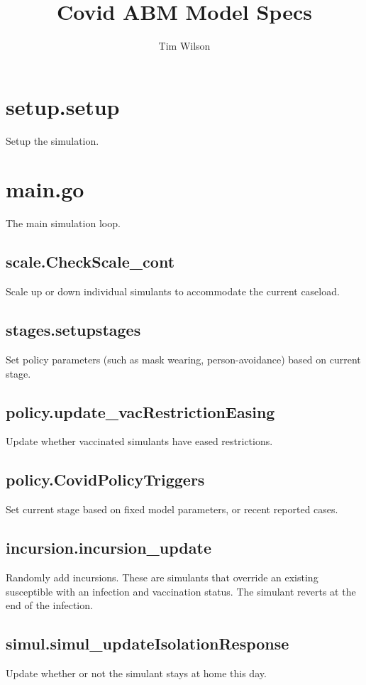 \documentclass[]{article}
\title{Covid ABM Model Specs}
\author{Tim Wilson}
\begin{document}
	
\maketitle

\section{setup.setup}
Setup the simulation.

\section{main.go}
The main simulation loop.

\subsection{scale.CheckScale\_cont}
Scale up or down individual simulants to accommodate the current caseload.

\subsection{stages.setupstages}
Set policy parameters (such as mask wearing, person-avoidance) based on current stage.

\subsection{policy.update\_vacRestrictionEasing}
Update whether vaccinated simulants have eased restrictions.

\subsection{policy.CovidPolicyTriggers}
Set current stage based on fixed model parameters, or recent reported cases.

\subsection{incursion.incursion\_update}
Randomly add incursions. These are simulants that override an existing susceptible with an infection and vaccination status. The simulant reverts at the end of the infection.

\subsection{simul.simul\_updateIsolationResponse}
Update whether or not the simulant stays at home this day.
\end{document}

